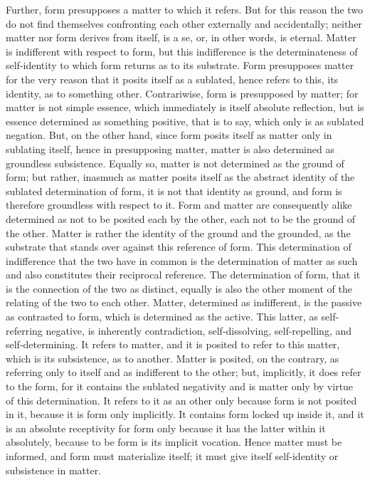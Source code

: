 Further, form presupposes a matter to which it refers.
But for this reason the two do not find themselves
confronting each other externally and accidentally;
neither matter nor form derives from itself, is a se,
or, in other words, is eternal.
Matter is indifferent with respect to form,
but this indifference is the determinateness
of self-identity to which
form returns as to its substrate.
Form presupposes matter for the very reason
that it posits itself as a sublated,
hence refers to this, its identity,
as to something other.
Contrariwise, form is presupposed by matter;
for matter is not simple essence,
which immediately is itself absolute reflection,
but is essence determined as something positive,
that is to say, which only is as sublated negation.
But, on the other hand, since form posits itself
as matter only in sublating itself,
hence in presupposing matter,
matter is also determined as groundless subsistence.
Equally so, matter is not determined as the ground of form;
but rather, inasmuch as matter posits itself as
the abstract identity of the sublated determination of form,
it is not that identity as ground,
and form is therefore groundless with respect to it.
Form and matter are consequently alike determined as
not to be posited each by the other,
each not to be the ground of the other.
Matter is rather the identity of
the ground and the grounded,
as the substrate that stands over
against this reference of form.
This determination of indifference that
the two have in common is
the determination of matter as such
and also constitutes their reciprocal reference.
The determination of form, that it is
the connection of the two as distinct,
equally is also the other moment of
the relating of the two to each other.
Matter, determined as indifferent,
is the passive as contrasted to form,
which is determined as the active.
This latter, as self-referring negative,
is inherently contradiction, self-dissolving,
self-repelling, and self-determining.
It refers to matter, and it is posited to refer to this matter,
which is its subsistence, as to another.
Matter is posited, on the contrary,
as referring only to itself
and as indifferent to the other;
but, implicitly, it does refer to the form,
for it contains the sublated negativity
and is matter only by virtue of this determination.
It refers to it as an other only
because form is not posited in it,
because it is form only implicitly.
It contains form locked up inside it,
and it is an absolute receptivity for form
only because it has the latter within it absolutely,
because to be form is its implicit vocation.
Hence matter must be informed,
and form must materialize itself;
it must give itself self-identity
or subsistence in matter.

